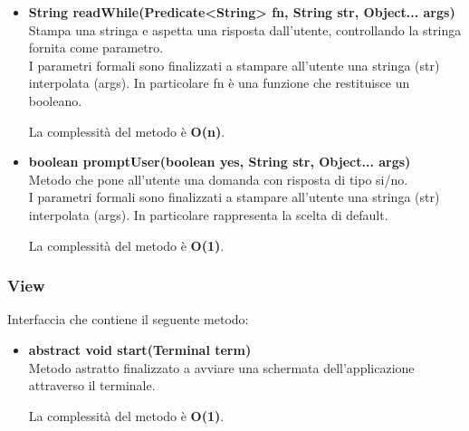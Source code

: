 \documentclass[a4paper, 12pt]{scrreprt}
\begin{document}
\begin{itemize}
					La complessit\`a del metodo è \textbf{O(1)}.
					
					\item \textbf{String readWhile(Predicate<String> fn, String str, Object... args)}
					\\Stampa una stringa e aspetta una risposta dall'utente, controllando la stringa fornita come parametro.
					\\I parametri formali sono finalizzati a stampare all'utente una stringa (str) interpolata (args). In particolare fn \`e una funzione che restituisce un booleano.
					
					La complessit\`a del metodo è \textbf{O(n)}.
	
					\item \textbf{boolean promptUser(boolean yes, String str, Object... args)}
					\\Metodo che pone all'utente una domanda con risposta di tipo si/no.
					\\I parametri formali sono finalizzati a stampare all'utente una stringa (str) interpolata (args). In particolare rappresenta la scelta di default.
					
					La complessit\`a del metodo è \textbf{O(1)}.
					
				\end{itemize}

				\subsubsection{View}
				Interfaccia che contiene il seguente metodo:
				\begin{itemize}
					\item \textbf{abstract void start(Terminal term)}
					\\Metodo astratto finalizzato a avviare una schermata dell'applicazione attraverso il terminale.
					
					La complessit\`a del metodo è \textbf{O(1)}.
				\end{itemize}
\end{document}

